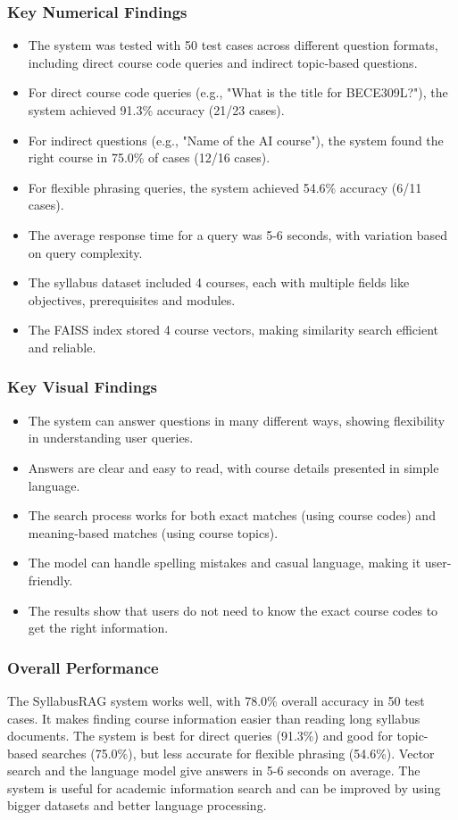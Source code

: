 \documentclass[conference]{IEEEtran}
\begin{document}
\subsubsection{\textbf{Key Numerical Findings}}
\begin{itemize}
    \item The system was tested with 50 test cases across different question formats, including direct course code queries and indirect topic-based questions.
    \item For direct course code queries (e.g., "What is the title for BECE309L?"), the system achieved 91.3\% accuracy (21/23 cases).
    \item For indirect questions (e.g., "Name of the AI course"), the system found the right course in 75.0\% of cases (12/16 cases).
    \item For flexible phrasing queries, the system achieved 54.6\% accuracy (6/11 cases).
    \item The average response time for a query was 5-6 seconds, with variation based on query complexity.
    \item The syllabus dataset included 4 courses, each with multiple fields like objectives, prerequisites and modules.
    \item The FAISS index stored 4 course vectors, making similarity search efficient and reliable.
\end{itemize}

\subsubsection{\textbf{Key Visual Findings}}
\begin{itemize}
    \item The system can answer questions in many different ways, showing flexibility in understanding user queries.
    \item Answers are clear and easy to read, with course details presented in simple language.
    \item The search process works for both exact matches (using course codes) and meaning-based matches (using course topics).
    \item The model can handle spelling mistakes and casual language, making it user-friendly.
    \item The results show that users do not need to know the exact course codes to get the right information.
\end{itemize}

\subsubsection{\textbf{Overall Performance}}
The SyllabusRAG system works well, with 78.0\% overall accuracy in 50 test cases. It makes finding course information easier than reading long syllabus documents. The system is best for direct queries (91.3\%) and good for topic-based searches (75.0\%), but less accurate for flexible phrasing (54.6\%). Vector search and the language model give answers in 5-6 seconds on average. The system is useful for academic information search and can be improved by using bigger datasets and better language processing.
\end{document}
